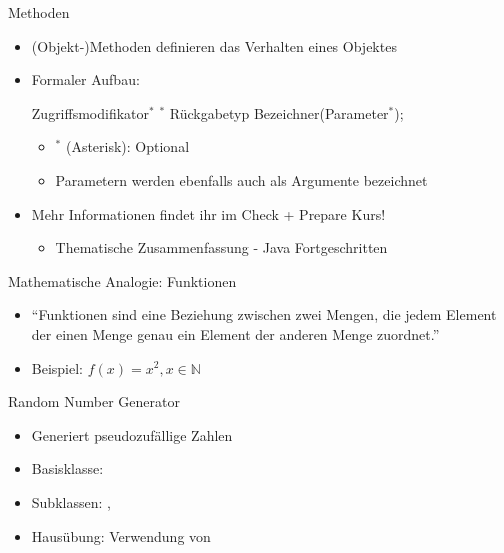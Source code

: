\documentclass{../tuda-beamer}
\begin{document}
  \begin{frame}{Methoden}
    \begin{itemize}
      \item (Objekt-)Methoden definieren das Verhalten eines Objektes
      \item Formaler Aufbau:

      \begin{center}
        Zugriffsmodifikator\(^*\)  \(^*\)  Rückgabetyp Bezeichner(Parameter\(^*\));
      \end{center}

      \begin{itemize}
        \item \(^*\) (Asterisk): Optional
        \item Parametern werden ebenfalls auch als Argumente bezeichnet
      \end{itemize}
      \item Mehr Informationen findet ihr im Check + Prepare Kurs!
      \begin{itemize}
        \item Thematische Zusammenfassung -  Java Fortgeschritten
      \end{itemize}
    \end{itemize}
  \end{frame}

  \begin{frame}
    
  \end{frame}

  \begin{frame}{Mathematische Analogie: Funktionen}
    \begin{itemize}
      \item \enquote{Funktionen sind eine Beziehung zwischen zwei Mengen, die jedem Element der
      einen Menge genau ein Element der anderen Menge zuordnet.}
      \item Beispiel: \(f(x) = x^2, x \in \mathbb{N}\)

      
    \end{itemize}
  \end{frame}

  \begin{frame}{Random Number Generator}
    \begin{itemize}
      \item Generiert pseudozufällige Zahlen
      \item Basisklasse: 
      \item Subklassen: , 
      \item Hausübung: Verwendung von 
    \end{itemize}
  \end{frame}
\end{document}
